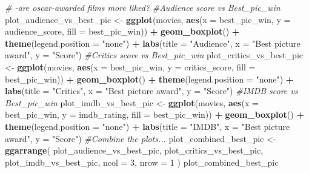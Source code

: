 \documentclass[]{article}
\newenvironment{Shaded}{\begin{snugshade}}{\end{snugshade}}
\newcommand{\CommentTok}[1]{\textcolor[rgb]{0.56,0.35,0.01}{\textit{#1}}}
\newcommand{\DataTypeTok}[1]{\textcolor[rgb]{0.13,0.29,0.53}{#1}}
\newcommand{\DecValTok}[1]{\textcolor[rgb]{0.00,0.00,0.81}{#1}}
\newcommand{\KeywordTok}[1]{\textcolor[rgb]{0.13,0.29,0.53}{\textbf{#1}}}
\newcommand{\NormalTok}[1]{#1}
\newcommand{\OperatorTok}[1]{\textcolor[rgb]{0.81,0.36,0.00}{\textbf{#1}}}
\newcommand{\StringTok}[1]{\textcolor[rgb]{0.31,0.60,0.02}{#1}}
\begin{document}
\begin{Shaded}
\begin{Highlighting}[]
\CommentTok{# -are oscar-awarded films more liked?}
\CommentTok{#Audience score vs Best_pic_win}
\NormalTok{plot_audience_vs_best_pic <-}
\StringTok{  }\KeywordTok{ggplot}\NormalTok{(movies,}
         \KeywordTok{aes}\NormalTok{(}\DataTypeTok{x =}\NormalTok{ best_pic_win, }\DataTypeTok{y =}\NormalTok{ audience_score, }\DataTypeTok{fill =}\NormalTok{ best_pic_win)) }\OperatorTok{+}\StringTok{ }\KeywordTok{geom_boxplot}\NormalTok{() }\OperatorTok{+}\StringTok{ }\KeywordTok{theme}\NormalTok{(}\DataTypeTok{legend.position =} \StringTok{"none"}\NormalTok{) }\OperatorTok{+}\StringTok{ }\KeywordTok{labs}\NormalTok{(}\DataTypeTok{title =} \StringTok{"Audience"}\NormalTok{, }\DataTypeTok{x =} \StringTok{"Best picture award"}\NormalTok{, }\DataTypeTok{y =} \StringTok{"Score"}\NormalTok{)}
\CommentTok{#Critics score vs Best_pic_win}
\NormalTok{plot_critics_vs_best_pic <-}
\StringTok{  }\KeywordTok{ggplot}\NormalTok{(movies,}
         \KeywordTok{aes}\NormalTok{(}\DataTypeTok{x =}\NormalTok{ best_pic_win, }\DataTypeTok{y =}\NormalTok{ critics_score, }\DataTypeTok{fill =}\NormalTok{ best_pic_win)) }\OperatorTok{+}\StringTok{ }\KeywordTok{geom_boxplot}\NormalTok{() }\OperatorTok{+}\StringTok{ }\KeywordTok{theme}\NormalTok{(}\DataTypeTok{legend.position =} \StringTok{"none"}\NormalTok{) }\OperatorTok{+}\StringTok{ }\KeywordTok{labs}\NormalTok{(}\DataTypeTok{title =} \StringTok{"Critics"}\NormalTok{, }\DataTypeTok{x =} \StringTok{"Best picture award"}\NormalTok{, }\DataTypeTok{y =} \StringTok{"Score"}\NormalTok{)}
\CommentTok{#IMDB score vs Best_pic_win}
\NormalTok{plot_imdb_vs_best_pic <-}
\StringTok{  }\KeywordTok{ggplot}\NormalTok{(movies, }\KeywordTok{aes}\NormalTok{(}\DataTypeTok{x =}\NormalTok{ best_pic_win, }\DataTypeTok{y =}\NormalTok{ imdb_rating, }\DataTypeTok{fill =}\NormalTok{ best_pic_win)) }\OperatorTok{+}
\StringTok{  }\KeywordTok{geom_boxplot}\NormalTok{() }\OperatorTok{+}\StringTok{ }\KeywordTok{theme}\NormalTok{(}\DataTypeTok{legend.position =} \StringTok{"none"}\NormalTok{) }\OperatorTok{+}\StringTok{ }\KeywordTok{labs}\NormalTok{(}\DataTypeTok{title =} \StringTok{"IMDB"}\NormalTok{, }\DataTypeTok{x =} \StringTok{"Best picture award"}\NormalTok{, }\DataTypeTok{y =} \StringTok{"Score"}\NormalTok{)}
\CommentTok{#Combine the plots...}
\NormalTok{plot_combined_best_pic <-}
\StringTok{  }\KeywordTok{ggarrange}\NormalTok{(}
\NormalTok{    plot_audience_vs_best_pic,}
\NormalTok{    plot_critics_vs_best_pic,}
\NormalTok{    plot_imdb_vs_best_pic,}
    \DataTypeTok{ncol =} \DecValTok{3}\NormalTok{,}
    \DataTypeTok{nrow =} \DecValTok{1}
\NormalTok{  )}
\NormalTok{plot_combined_best_pic}
\end{Highlighting}
\end{Shaded}
\end{document}

